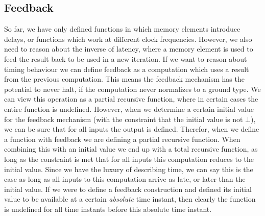 \subsection{Feedback}
So far, we have only defined functions in which memory elements introduce delays, or functions which work at different clock frequencies.
However, we also need to reason about the inverse of latency, where a memory element is used to feed the result back to be used in a new iteration. 
If we want to reason about timing behaviour we can define feedback as a computation which uses a result from the previous computation.
This means the feedback mechanism has the potential to never halt, if the computation never normalizes to a ground type.
We can view this operation as a partial recursive function, where in certain cases the entire function is undefined. 
However, when we determine a certain initial value for the feedback mechanism (with the constraint that the initial value is not \ensuremath{\bot }), we can be sure that for all inputs the output is defined. 
Therefor, when we define a function with feedback we are defining a partial recursive function.
When combining this with an initial value we end up with a total recursive function, as long as the constraint is met that for all inputs this computation reduces to the initial value.
Since we have the luxury of describing time, we can say this is the case as long as all inputs to this computation arrive as late, or later than the initial value.
If we were to define a feedback construction and defined its initial value to be available at a certain \textit{absolute} time instant, then clearly the function is undefined for all time instants before this absolute time instant.

